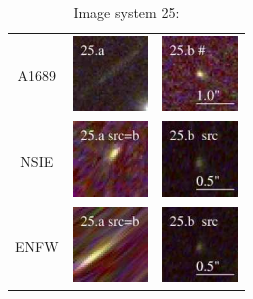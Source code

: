 \documentclass[useAMS,usenatbib]{mn2e}
\begin{document}
\clearpage

\begin{table}
  \caption{Image system 25:}\vspace{0mm}
  \begin{tabular}{ccc}
    \multicolumn{1}{m{1cm}}{{\Large A1689}}
    & \multicolumn{1}{m{1.7cm}}{\includegraphics[height=2.00cm,clip]{figs/nsie_img/rgb.img_25_a.ps}}
    & \multicolumn{1}{m{1.7cm}}{\includegraphics[height=2.00cm,clip]{figs/nsie_img/rgb.img_25_b.ps}} \\
    \multicolumn{1}{m{1cm}}{{\Large NSIE}}
    & \multicolumn{1}{m{1.7cm}}{\includegraphics[height=2.00cm,clip]{figs/nsie_img/rgb.pre_25_a_b_tri.ps}}
    & \multicolumn{1}{m{1.7cm}}{\includegraphics[height=2.00cm,clip]{figs/nsie_img/rgb.src_25_b.ps}} \\
    \multicolumn{1}{m{1cm}}{{\Large ENFW}}
    & \multicolumn{1}{m{1.7cm}}{\includegraphics[height=2.00cm,clip]{figs/enfw_img/rgb.pre_25_a_b_tri.ps}}
    & \multicolumn{1}{m{1.7cm}}{\includegraphics[height=2.00cm,clip]{figs/enfw_img/rgb.src_25_b.ps}} \\
  \end{tabular}

\end{table}
\end{document}
